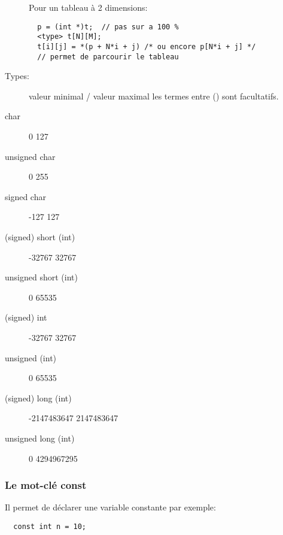 \documentclass[a4paper]{article}
\begin{document}
\begin{description}
  Pour un tableau à 2 dimensions:
  \begin{lstlisting}
  p = (int *)t;  // pas sur a 100 %
  <type> t[N][M];
  t[i][j] = *(p + N*i + j) /* ou encore p[N*i + j] */
  // permet de parcourir le tableau
  \end{lstlisting}

  \item [Types:]  valeur minimal / valeur maximal les termes entre \guillemotleft{} () \guillemotright{} sont facultatifs.
  \item [char] 	0 	127
  \item [unsigned char] 	0 	255
  \item [signed char] 	-127 	127
  \item [(signed) short (int)] 	-32767 	32767
  \item [unsigned short (int)]	0 	65535
  \item [(signed) int] 	-32767 	32767
  \item [unsigned (int)] 	0 	65535
  \item [(signed) long (int)] 	-2147483647 	2147483647
  \item [unsigned long (int)] 	0 	4294967295
\end{description}
\subsubsection{Le mot-clé const}
Il permet de déclarer une variable constante par exemple:
\begin{lstlisting}
  const int n = 10;
\end{lstlisting}
\end{document}

